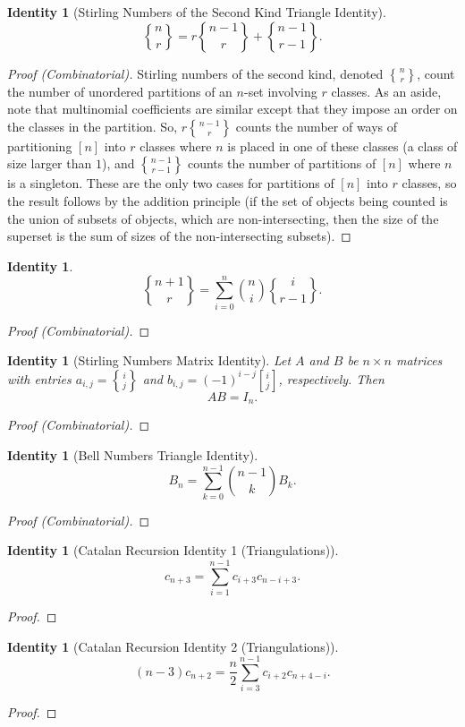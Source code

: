 \documentclass[12]{article}
\newcounter{identityCounter}
\newtheorem{iden}[identityCounter]{Identity}
\theoremstyle{definition}
\begin{document}
	\begin{iden}[Stirling Numbers of the Second Kind Triangle Identity]
		$${n \brace r} = r{n-1 \brace r} + {n-1 \brace r-1}.$$
	\end{iden}
	\begin{proof}[Proof (Combinatorial)]
		Stirling numbers of the second kind, denoted ${n \brace r}$, count the number of unordered partitions of an $n$-set involving $r$ classes.  As an aside, note that multinomial coefficients are similar except that they impose an order on the classes in the partition.  So, $r{n-1 \brace r}$ counts the number of ways of partitioning $[n]$ into $r$ classes where $n$ is placed in one of these classes (a class of size larger than $1$), and ${n-1 \brace r-1}$ counts the number of partitions of $[n]$ where $n$ is a singleton.  These are the only two cases for partitions of $[n]$ into $r$ classes, so the result follows by the addition principle (if the set of objects being counted is the union of subsets of objects, which are non-intersecting, then the size of the superset is the sum of sizes of the non-intersecting subsets).
	\end{proof}

	\begin{iden}
		$${n+1 \brace r} = \sum_{i=0}^n {n \choose i} {i \brace r-1}.$$
	\end{iden}
	\begin{proof}[Proof (Combinatorial)]
		
	\end{proof}
	
	\begin{iden}[Stirling Numbers Matrix Identity]
		Let $A$ and $B$ be $n \times n$ matrices with entries $a_{i,j} = {i \brace j}$ and $b_{i,j} = (-1)^{i-j}{i \brack j}$, respectively.  Then
		$$AB = I_n.$$
	\end{iden}
	\begin{proof}[Proof (Combinatorial)]
		
	\end{proof}

	\begin{iden}[Bell Numbers Triangle Identity]
		$$B_n = \sum_{k=0}^{n-1} {n-1 \choose k}B_k.$$
	\end{iden}
	\begin{proof}[Proof (Combinatorial)]
		
	\end{proof}
	
	\begin{iden}[Catalan Recursion Identity 1 (Triangulations)]
		$$c_{n+3} = \sum_{i=1}^{n-1}c_{i+3}c_{n-i+3}.$$
	\end{iden}
	\begin{proof}
		
	\end{proof}
	\begin{iden}[Catalan Recursion Identity 2 (Triangulations)]
		$$(n-3)c_{n+2} = \frac{n}{2}\sum_{i=3}^{n-1}c_{i+2}c_{n+4-i}.$$
	\end{iden}
	\begin{proof}
		
	\end{proof}
	
\end{document}
